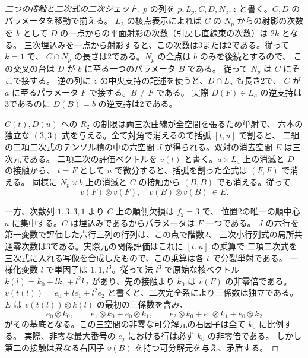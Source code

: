 \begin{proof}[二つの接触と二次式の二次ジェット]
$p$ の列を $p,L_p,C,D,N_a,z$ と書く。$C,D$ のパラメータを移動で揃える。
$L_2$ の核点表示によれば $C$ の $N_p$ からの射影の次数を $k$ として
$D$ の一点からの平面射影の次数（引戻し直線束の次数）は $2k$ となる。
三次埋込みを一点から射影すると、この次数は3または2である。従って $k=1$ で、
$C\cap N_p$ の長さは2である。$N_p$ の全点は $b$ のみを後続とするので、
この交叉の台は $D$ が $b$ に至る一つのパラメータ $B$ である。
従って $N_p$ は $C$ にそこで接する。
逆の列に $z$ の中央支持の記述を使うと、$D\cap L_a$ も長さ2で、
$C$ が $a$ に至るパラメータ $F$ で接する。$B\ne F$ である。
実際 $D(F)\in L_a$ の逆支持は3であるのに $D(B)=b$ の逆支持は2である。

$C(t),D(u)$ への $R_2$ の制限は両三次曲線が全空間を張るため単射で、
六本の独立な $(3,3)$ 式を与える。全て対角で消えるので括弧 $[t,u]$ で割ると、
二組の二項二次式のテンソル積の中の六空間 $J$ が得られる。双対の消去空間 $E$ は三次元である。
二項二次の評価ベクトルを $v(t)$ と書く。$a\times L_a$ 上の消滅と $D$ の接触から、
$t=F$ として $u$ で微分すると、括弧を割った全式は $(F,F)$ で消える。
同様に $N_p\times b$ 上の消滅と $C$ の接触から $(B,B)$ でも消える。従って
\[
                v(F)\otimes v(F),\quad v(B)\otimes v(B)\ \in E .
\]

一方、次数列 $1,3,3,1$ より $C$ 上の順側欠損は $f_2=3$ で、
位置2の唯一の順中心 $a$ に集中する。$C$ は埋込みであるからパラメータは $F$ 一つである。
$J$ の六行を第一変数で評価した六行三列の行列は、この点で階数2、
三次小行列式の局所共通零次数は3である。実際元の関係評価はこれに $[t,u]$ の乗算で
二項二次式を三次式に入れる写像を合成したもので、この乗算は各 $t$ で分裂単射である。
一様化変数 $l$ で単因子は $1,1,l^3$。従って法 $l^3$ で原始な核ベクトル
$k(l)=k_0+lk_1+l^2k_2$ があり、先の接触より $k_0$ は $v(F)$ の非零倍である。
$v(t(l))=e_0+le_1+l^2e_2$ と書くと、二次完全系により三係数は独立である。
$E$ は $v(t(l))\otimes k(l)$ の最初の三係数を含み、
\[
 e_0\otimes k_0,\qquad e_1\otimes k_0+e_0\otimes k_1,\qquad
 e_2\otimes k_0+e_1\otimes k_1+e_0\otimes k_2
\]
がその基底となる。この三空間の非零な可分解元の右因子は全て $k_0$ に比例する。
実際、非零な最大番号の $e_j$ における行は必ず $k_0$ の非零倍である。
しかし第二の接触は異なる右因子 $v(B)$ を持つ可分解元を与え、矛盾する。
\end{proof}
